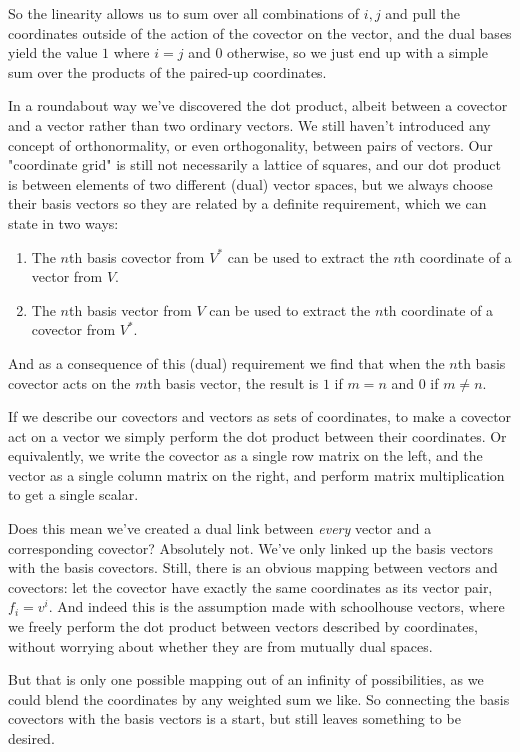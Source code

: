 So the linearity allows us to sum over all combinations of $i, j$ and pull the coordinates outside of the action of the covector on the vector, and the dual bases yield the value $1$ where $i = j$ and $0$ otherwise, so we just end up with a simple sum over the products of the paired-up coordinates.

In a roundabout way we've discovered the dot product, albeit between a covector and a vector rather than two ordinary vectors. We still haven't introduced any concept of orthonormality, or even orthogonality, between pairs of vectors. Our "coordinate grid" is still not necessarily a lattice of squares, and our dot product is between elements of two different (dual) vector spaces, but we always choose their basis vectors so they are related by a definite requirement, which we can state in two ways:

\begin{enumerate}
    \item The $n$th basis covector from $V^*$ can be used to extract the $n$th coordinate of a vector from $V$.
    \item The $n$th basis vector from $V$ can be used to extract the $n$th coordinate of a covector from $V^*$.
\end{enumerate}

And as a consequence of this (dual) requirement we find that when the $n$th basis covector acts on the $m$th basis vector, the result is $1$ if $m = n$ and $0$ if $m \ne n$.

If we describe our covectors and vectors as sets of coordinates, to make a covector act on a vector we simply perform the dot product between their coordinates. Or equivalently, we write the covector as a single row matrix on the left, and the vector as a single column matrix on the right, and perform matrix multiplication to get a single scalar.

Does this mean we've created a dual link between \textit{every} vector and a corresponding covector? Absolutely not. We've only linked up the basis vectors with the basis covectors. Still, there is an obvious mapping between vectors and covectors: let the covector have exactly the same coordinates as its vector pair, $f_i = v^i$. And indeed this is the assumption made with schoolhouse vectors, where we freely perform the dot product between vectors described by coordinates, without worrying about whether they are from mutually dual spaces.

But that is only one possible mapping out of an infinity of possibilities, as we could blend the coordinates by any weighted sum we like. So connecting the basis covectors with the basis vectors is a start, but still leaves something to be desired.

